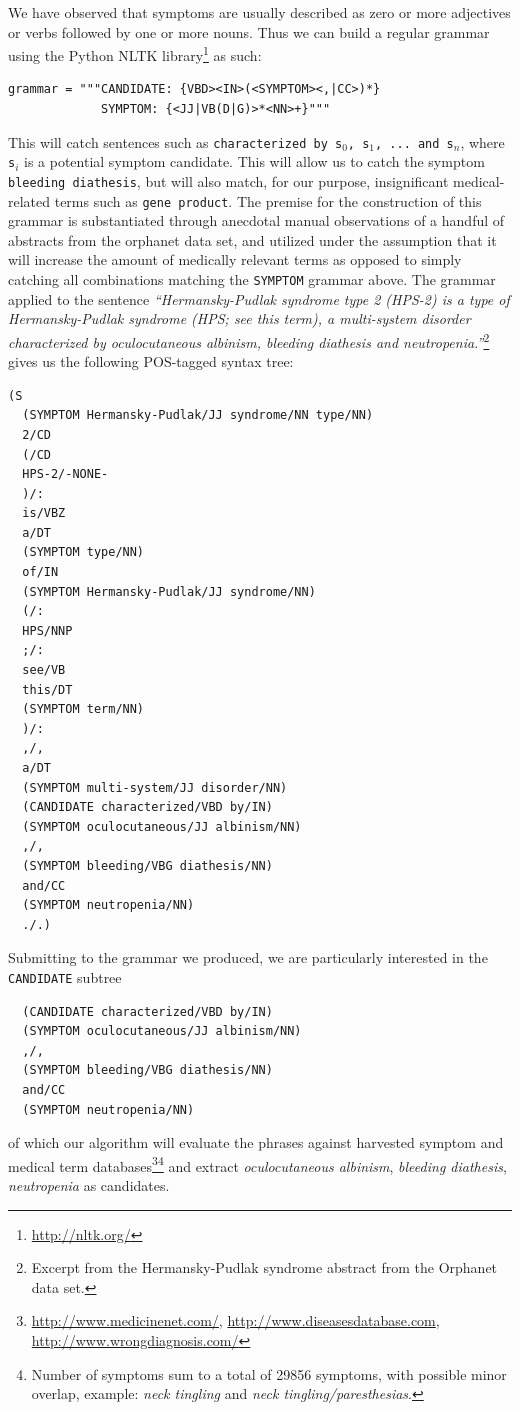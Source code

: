 \documentclass[10pt,letterpaper,draft]{article}
\begin{document}
We have observed that symptoms are usually described as zero or more
adjectives or verbs followed by one or more nouns.
Thus we can build a regular grammar using the Python NLTK library\footnote{\url{http://nltk.org/}} as
such:
\begin{lstlisting}
grammar = """CANDIDATE: {VBD><IN>(<SYMPTOM><,|CC>)*}
             SYMPTOM: {<JJ|VB(D|G)>*<NN>+}"""
\end{lstlisting}
This will catch sentences such as \texttt{characterized by s$_{0}$,
s$_{1}$, ... and s$_{n}$}, where \texttt{s$_{i}$} is a potential symptom
candidate.
This will allow us to catch the symptom \texttt{bleeding diathesis}, but
will also match, for our purpose, insignificant medical-related terms
such as \texttt{gene product}.
The premise for the construction of this grammar is substantiated
through anecdotal manual observations of a handful of abstracts from the
orphanet data set, and utilized under the assumption that it will
increase the amount of medically relevant terms as opposed to simply
catching all combinations matching the \texttt{SYMPTOM} grammar above.
The grammar applied to the sentence \textit{``Hermansky-Pudlak syndrome
type 2 (HPS-2) is a type of Hermansky-Pudlak syndrome (HPS; see this
term), a multi-system disorder characterized by oculocutaneous albinism,
bleeding diathesis and neutropenia.''}\footnote{Excerpt from the
Hermansky-Pudlak syndrome abstract from the Orphanet data set.} gives us
the following POS-tagged syntax tree:
\begin{lstlisting}
(S
  (SYMPTOM Hermansky-Pudlak/JJ syndrome/NN type/NN)
  2/CD
  (/CD
  HPS-2/-NONE-
  )/:
  is/VBZ
  a/DT
  (SYMPTOM type/NN)
  of/IN
  (SYMPTOM Hermansky-Pudlak/JJ syndrome/NN)
  (/:
  HPS/NNP
  ;/:
  see/VB
  this/DT
  (SYMPTOM term/NN)
  )/:
  ,/,
  a/DT
  (SYMPTOM multi-system/JJ disorder/NN)
  (CANDIDATE characterized/VBD by/IN)
  (SYMPTOM oculocutaneous/JJ albinism/NN)
  ,/,
  (SYMPTOM bleeding/VBG diathesis/NN)
  and/CC
  (SYMPTOM neutropenia/NN)
  ./.)
\end{lstlisting}
Submitting to the grammar we produced, we are particularly interested in
the \texttt{CANDIDATE} subtree
\begin{lstlisting}
  (CANDIDATE characterized/VBD by/IN)
  (SYMPTOM oculocutaneous/JJ albinism/NN)
  ,/,
  (SYMPTOM bleeding/VBG diathesis/NN)
  and/CC
  (SYMPTOM neutropenia/NN)
\end{lstlisting}
of which our algorithm will evaluate the phrases against harvested
symptom and medical term
databases\footnote{\url{http://www.medicinenet.com/},
\url{http://www.diseasesdatabase.com},
\url{http://www.wrongdiagnosis.com/}}\footnote{Number of symptoms sum to
a total of 29856 symptoms, with possible minor overlap, example:
\textit{neck tingling} and \textit{neck tingling/paresthesias}.} and extract
\textit{oculocutaneous albinism}, \textit{bleeding diathesis},
\textit{neutropenia} as candidates.
\end{document}
